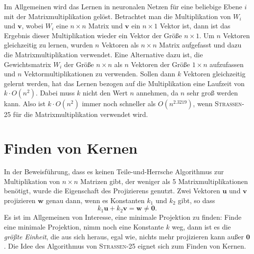 \documentclass{report}
\numberwithin{equation}{section}
\begin{document}
Im Allgemeinen wird das Lernen in neuronalen Netzen für eine beliebige Ebene $i$ mit der Matrixmultiplikation gelöst. Betrachtet man die Multiplikation von $W_i$ und $\boldsymbol{v}$, wobei $W_i$ eine $n \times n$ Matrix und $\boldsymbol{v}$ ein $n \times 1$ Vektor ist, dann ist das Ergebnis dieser Multiplikation wieder ein Vektor der Größe $n \times 1$. Um $n$ Vektoren gleichzeitig zu lernen, wurden $n$ Vektoren als $n \times n$ Matrix aufgefasst und dazu die Matrixmultiplikation verwendet. Eine Alternative dazu ist, die Gewichtsmatrix $W_i$ der Größe $n \times n$ als $n$ Vektoren der Größe $1 \times n$ aufzufassen und $n$ Vektormultiplikationen zu verwenden. Sollen dann $k$ Vektoren gleichzeitig gelernt werden, hat das Lernen bezogen auf die Multiplikation eine Laufzeit von $k \cdot O(n^2)$. Dabei muss $k$ nicht den Wert $n$ annehmen, da $n$ sehr groß werden kann. Also ist $k \cdot O(n^2)$ immer noch schneller als $O(n^{2.3219})$, wenn \textsc{Strassen-25} für die Matrixmultiplikation verwendet wird. 

\section{Finden von Kernen}
In der Beweisführung, dass es keinen Teile-und-Herrsche Algorithmus zur Multiplikation von $n \times n$ Matrizen gibt, der weniger als 5 Matrixmultiplikationen benötigt, wurde die Eigenschaft des Projizierens genutzt. Zwei Vektoren $\boldsymbol{u}$ und $\boldsymbol{v}$ projizieren $\boldsymbol{w}$ genau dann, wenn es Konstanten $k_1$ und $k_2$ gibt, so dass $$k_1 \boldsymbol{u} + k_2\boldsymbol{v} = \boldsymbol{w} \neq \boldsymbol{0}.$$ Es ist im Allgemeinen von Interesse, eine minimale Projektion zu finden: Finde eine minimale Projektion, nimm noch eine Konstante $k$ weg, dann ist es die \textit{größte Einheit}, die aus sich heraus, egal wie, nichts mehr projizieren kann außer $\boldsymbol{0}$. Die Idee des Algorithmus von \textsc{Strassen-25} eignet sich zum Finden von Kernen.
\end{document}
